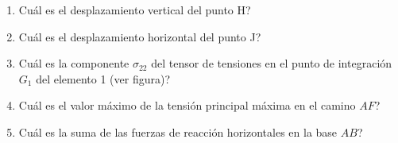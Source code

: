 \begin{enumerate}
\item Cuál es el desplazamiento vertical del punto H?
  \begin{multicols}{4}
\columnbreak
{}
\columnbreak
{}
\columnbreak
{}
  \end{multicols}
\item Cuál es el desplazamiento horizontal del punto J?
  \begin{multicols}{4}
\columnbreak
{} %
\columnbreak
{}
\columnbreak
{}
  \end{multicols}
\item Cuál es la componente $\sigma_{22}$ del tensor de tensiones en el punto de integración $G_1$ del elemento 1 (ver figura)?
  \begin{multicols}{4}
\columnbreak
{}
\columnbreak
{}
\columnbreak
{}
  \end{multicols}
\item Cuál es el valor máximo de la tensión principal máxima en el camino $AF$?
  \begin{multicols}{4}
\columnbreak
{} %
\columnbreak
{}
\columnbreak
{}
\end{multicols}
\item Cuál es la suma de las fuerzas de reacción horizontales en la base $AB$?
  \begin{multicols}{4}
\columnbreak
{}
\columnbreak
{}
\columnbreak
{}
  \end{multicols}
\end{enumerate}

